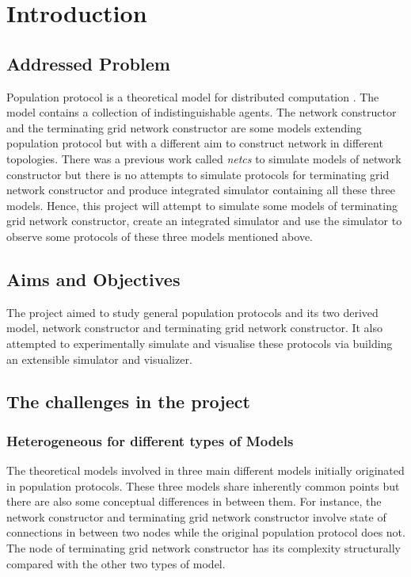 \section{Introduction}
\subsection{Addressed Problem}
Population protocol is a theoretical model for distributed computation \cite{AspnesR2007, MCS11}.
The model contains a collection of indistinguishable agents. The network constructor \cite{MS16a} and the
terminating grid network constructor \cite{Mi17} are some models extending population protocol but with a different aim to construct network in different topologies.
There was a previous work called \textit{netcs} to simulate models of network constructor but there is no attempts
to simulate protocols for terminating grid network constructor and produce integrated simulator containing all these three models.
Hence, this project will attempt to simulate some models of terminating grid network constructor, create an integrated simulator and
use the simulator to observe some protocols of these three models mentioned above.

\subsection{Aims and Objectives}
\par\noindent
The project aimed to study general population protocols \cite{AspnesR2007} and
its two derived model,
network constructor \cite{MS16a} and terminating grid network constructor. \cite{Mi17}
It also attempted to experimentally simulate and visualise these protocols
via building an extensible simulator and visualizer.

\subsection{The challenges in the project}
\subsubsection{Heterogeneous for different types of Models}

\par\noindent
The theoretical models involved in three main different models initially originated in
population protocols. These three models share inherently common points but there are also some
conceptual differences in between them. For instance, the network constructor \cite{MS16a} and terminating
grid network constructor \cite{Mi17}
involve state of connections in between two nodes while the original population protocol does not.
The node of terminating grid network constructor has its complexity structurally compared with
the other two types of model.

